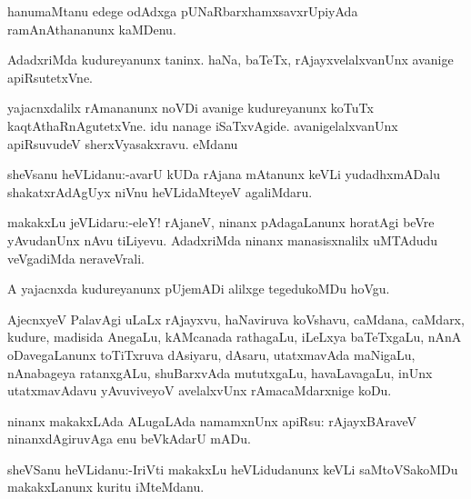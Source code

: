 \documentclass{article}
\begin{document}
\begin{mn}%
hanumaMtanu edege odAdxga pUNaRbarxhamxsavxrUpiyAda ramAnAthananunx kaMDenu.
\end{mn}

\begin{mn}%
AdadxriMda kudureyanunx taninx. haNa, baTeTx, rAjayxvelalxvanUnx avanige apiRsutetxVne.
\end{mn}

\begin{mn}%
yajacnxdalilx rAmananunx noVDi avanige kudureyanunx koTuTx kaqtAthaRnAgutetxVne. idu nanage 
iSaTxvAgide. avanigelalxvanUnx apiRsuvudeV sherxVyasakxravu. eMdanu 
\end{mn}


\begin{mn}%
sheVsanu heVLidanu:-avarU kUDa rAjana mAtanunx keVLi yudadhxmADalu shakatxrAdAgUyx niVnu 
heVLidaMteyeV agaliMdaru.
\end{mn}

\begin{mn}%
makakxLu jeVLidaru:-eleY! rAjaneV, ninanx pAdagaLanunx horatAgi beVre yAvudanUnx nAvu 
tiLiyevu. AdadxriMda ninanx manasisxnalilx uMTAdudu veVgadiMda neraveVrali.
\end{mn}

\begin{mn}%
A yajacnxda kudureyanunx pUjemADi alilxge tegedukoMDu hoVgu.
\end{mn}

\begin{mn}%
AjecnxyeV PalavAgi uLaLx rAjayxvu, haNaviruva koVshavu, caMdana, caMdarx, kudure, madisida 
AnegaLu, kAMcanada rathagaLu, iLeLxya baTeTxgaLu, nAnA oDavegaLanunx toTiTxruva dAsiyaru, 
dAsaru, utatxmavAda maNigaLu, nAnabageya ratanxgALu, shuBarxvAda mututxgaLu, havaLavagaLu,
inUnx utatxmavAdavu yAvuviveyoV avelalxvUnx rAmacaMdarxnige koDu.
\end{mn}

\begin{mn}%
ninanx makakxLAda ALugaLAda namamxnUnx apiRsu: rAjayxBAraveV ninanxdAgiruvAga enu 
beVkAdarU mADu.
\end{mn}

\begin{mn}%
sheVSanu heVLidanu:-IriVti makakxLu heVLidudanunx keVLi saMtoVSakoMDu makakxLanunx kuritu 
iMteMdanu.
\end{mn}
\end{document}
